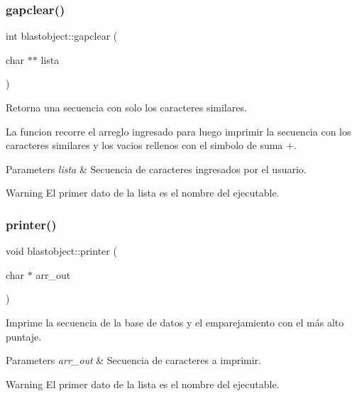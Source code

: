 \subsubsection{gapclear()}
{\footnotesize\ttfamily int blastobject\+::gapclear (\begin{DoxyParamCaption}\item[{char $\ast$$\ast$}]{lista }\end{DoxyParamCaption})}



Retorna una secuencia con solo los caracteres similares. 

La funcion recorre el arreglo ingresado para luego imprimir la secuencia con los caracteres similares y los vacios rellenos con el simbolo de suma +.


\begin{DoxyParams}{Parameters}
{\em lista} & Secuencia de caracteres ingresados por el usuario. \\
\hline
\end{DoxyParams}
\begin{DoxyWarning}{Warning}
El primer dato de la lista es el nombre del ejecutable. 
\end{DoxyWarning}
\label{classblastobject_a8a86ef19ef6a1c0f98366497d00ff0c7} 
\subsubsection{printer()}
{\footnotesize\ttfamily void blastobject\+::printer (\begin{DoxyParamCaption}\item[{char $\ast$}]{arr\+\_\+out }\end{DoxyParamCaption})}



Imprime la secuencia de la base de datos y el emparejamiento con el más alto puntaje. 


\begin{DoxyParams}{Parameters}
{\em arr\+\_\+out} & Secuencia de caracteres a imprimir. \\
\hline
\end{DoxyParams}
\begin{DoxyWarning}{Warning}
El primer dato de la lista es el nombre del ejecutable. 
\end{DoxyWarning}
\label{classblastobject_a0426c755487823aebf8734b19e668a49} 
